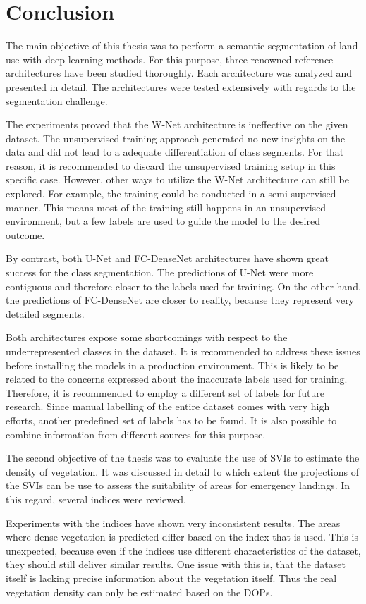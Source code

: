 \section{Conclusion}
The main objective of this thesis was to perform a semantic segmentation of land use with deep learning methods. For this purpose, three renowned reference architectures have been studied thoroughly. Each architecture was analyzed and presented in detail. The architectures were tested extensively with regards to the segmentation challenge.

The experiments proved that the W-Net architecture is ineffective on the given dataset. The unsupervised training approach generated no new insights on the data and did not lead to a adequate differentiation of class segments. For that reason, it is recommended to discard the unsupervised training setup in this specific case. However, other ways to utilize the W-Net architecture can still be explored. For example, the training could be conducted in a semi-supervised manner. This means most of the training still happens in an unsupervised environment, but a few labels are used to guide the model to the desired outcome.

By contrast, both U-Net and FC-DenseNet architectures have shown great success for the class segmentation. The predictions of U-Net were more contiguous and therefore closer to the labels used for training. On the other hand, the predictions of FC-DenseNet are closer to reality, because they represent very detailed segments. 

Both architectures expose some shortcomings with respect to the underrepresented classes in the dataset. It is recommended to address these issues before installing the models in a production environment. This is likely to be related to the concerns expressed about the inaccurate labels used for training. Therefore, it is recommended to employ a different set of labels for future research. Since manual labelling of the entire dataset comes with very high efforts, another predefined set of labels has to be found. It is also possible to combine information from different sources for  this purpose.

The second objective of the thesis was to evaluate the use of SVIs to estimate the density of vegetation. It was discussed in detail to which extent the projections of the SVIs can be use to assess the suitability of areas for emergency landings. In this regard, several indices were reviewed.

Experiments with the indices have shown very inconsistent results. The areas where dense vegetation is predicted differ based on the index that is used. This is unexpected, because even if the indices use different characteristics of the dataset, they should still deliver similar results. One issue with this is, that the dataset itself is lacking precise information about the vegetation itself. Thus the real vegetation density can only be estimated based on the DOPs.


